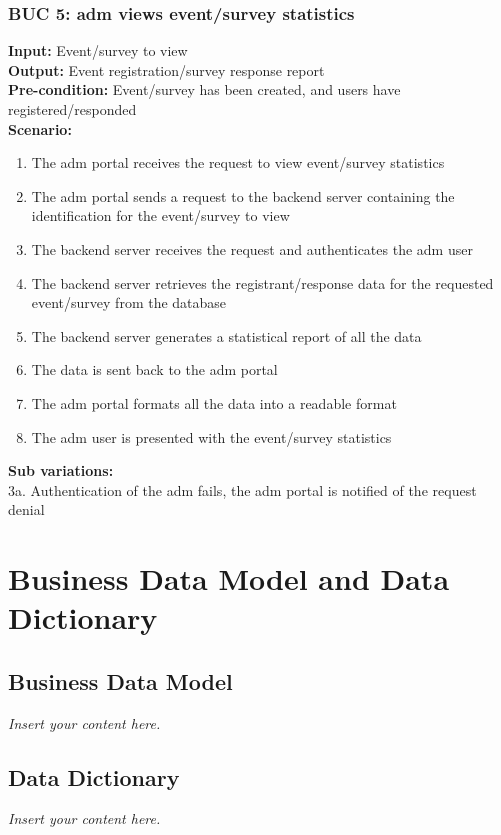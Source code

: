 \documentclass[12pt]{article}
\newcommand{\lips}{\textit{Insert your content here.}}
\begin{document}
\subsubsection*{BUC 5: \Gls{adm} views event/survey statistics}
\textbf{Input:} Event/survey to view \\
\textbf{Output:} Event registration/survey response report \\
\textbf{Pre-condition:} Event/survey has been created, and users have registered/responded \\
\textbf{Scenario:}
\begin{enumerate}
  \item The \gls{adm} portal receives the request to view event/survey statistics
  \item The \gls{adm} portal sends a request to the backend server containing the identification for the event/survey to view
  \item The backend server receives the request and authenticates the \gls{adm} user
  \item The backend server retrieves the registrant/response data for the requested event/survey from the database
  \item The backend server generates a statistical report of all the data
  \item The data is sent back to the \gls{adm} portal
  \item The \gls{adm} portal formats all the data into a readable format
  \item The \gls{adm} user is presented with the event/survey statistics
\end{enumerate}
\textbf{Sub variations:} \\
3a. Authentication of the \gls{adm} fails, the \gls{adm} portal is notified of the request denial \\


\section{Business Data Model and Data Dictionary}
\subsection{Business Data Model}
\lips
\subsection{Data Dictionary}
\lips
\end{document}
